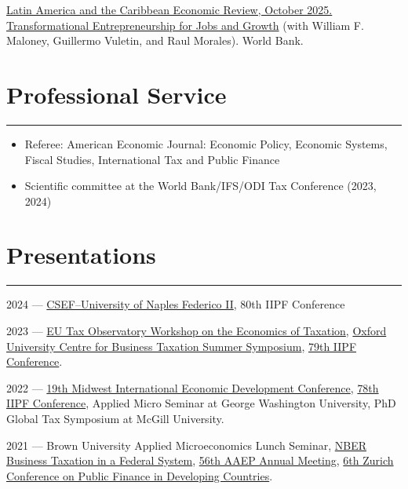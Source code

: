 \documentclass[a4paper,11pt]{article}
\newcommand{\sectitle}[1]{
    \vspace{1.5ex}
    \section{#1}
    \vspace{-2.5ex}
    \noindent\rule{\textwidth}{0.5pt}
    \vspace{-4ex}
}
\begin{document}
\href{https://openknowledge.worldbank.org/items/6323d1d1-0edf-4e01-b26c-47faa6aeb573}{Latin America and the Caribbean Economic Review, October 2025. Transformational Entrepreneurship for Jobs and Growth}
(with William F. Maloney, Guillermo Vuletin, and Raul Morales). World Bank.

\sectitle{Professional Service}

\begin{itemize}
    \item Referee: American Economic Journal: Economic Policy, Economic Systems, Fiscal Studies, International Tax and Public Finance
    \item Scientific committee at the World Bank/IFS/ODI Tax Conference (2023, 2024)
\end{itemize}

\sectitle{Presentations}

2024 --- 
\href{https://csef.it/events/seminars/#p-spring-2024-seminars}{CSEF–University of Naples Federico II},
80th IIPF Conference

2023 --- 
\href{https://mcas-proxyweb.mcas.ms/certificate-checker?login=false&originalUrl=https%3A%2F%2Fwww.taxobservatory.eu.mcas.ms%2Fevent%2Fthe-economics-of-taxation%2F%3FMcasTsid%3D20893&McasCSRF=5ba3d86c28f14735db38be157f59c05c3f0ff2d9cf16409c0cb1934f7b1bf41c}{EU Tax Observatory Workshop on the Economics of Taxation}, 
\href{https://mcas-proxyweb.mcas.ms/certificate-checker?login=false&originalUrl=https%3A%2F%2Foxfordtax.sbs.ox.ac.uk.mcas.ms%2Fevent%2Fannual-academic-symposium-2023%3FMcasTsid%3D20893&McasCSRF=5ba3d86c28f14735db38be157f59c05c3f0ff2d9cf16409c0cb1934f7b1bf41c}{Oxford University Centre for Business Taxation Summer Symposium}, 
\href{https://www.conftool.pro/iipf2023/index.php?page=browseSessions&presentations=show&search=Garriga}{79th IIPF Conference}.

2022 --- 
\href{https://sites.google.com/a/umn.edu/miedc/}{19th Midwest International Economic Development Conference}, 
\href{https://www.iipf.org/congress2022.htm}{78th IIPF Conference}, 
Applied Micro Seminar at George Washington University, 
PhD Global Tax Symposium at McGill University.

2021 --- 
Brown University Applied Microeconomics Lunch Seminar, 
\href{https://www.nber.org/conferences/business-taxation-federal-system-fall-2021}{NBER Business Taxation in a Federal System}, 
\href{https://aaep.org.ar/reuniones-anuales-aaep/lvi-reunion-anual-buenos-aires/}{56th AAEP Annual Meeting}, 
\href{https://www.econ.uzh.ch/dam/jcr:c4ffd510-e423-45db-bf6f-a0c4a465bf8b/Program%20CED_2021.pdf}{6th Zurich Conference on Public Finance in Developing Countries}.
\end{document}
